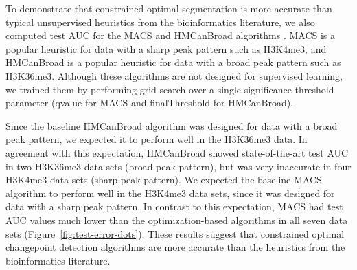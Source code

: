 \documentclass{article}
\begin{document}
To demonstrate that constrained optimal segmentation is more accurate
than typical unsupervised heuristics from the bioinformatics
literature, we also computed test AUC for the MACS and HMCanBroad
algorithms \citep{MACS, HMCan}. MACS is a popular heuristic for data
with a sharp peak pattern such as H3K4me3, and \mbox{HMCanBroad} is a
popular heuristic for data with a broad peak pattern such as
H3K36me3. Although these algorithms are not designed for supervised
learning, we trained them by performing grid search over a single
significance threshold parameter (qvalue for MACS and finalThreshold
for HMCanBroad).

Since the baseline HMCanBroad algorithm was designed for data with a
broad peak pattern, we expected it to perform well in the H3K36me3
data. In agreement with this expectation, HMCanBroad showed
state-of-the-art test AUC in two H3K36me3 data sets (broad peak
pattern), but was very inaccurate in four H3K4me3 data sets (sharp
peak pattern). We expected the baseline MACS algorithm to perform well
in the H3K4me3 data sets, since it was designed for data with a sharp
peak pattern. In contrast to this expectation, MACS had test AUC
values much lower than the optimization-based algorithms in all seven
data sets (Figure~\ref{fig:test-error-dots}). These results suggest
that constrained optimal changepoint detection algorithms are more
accurate than the heuristics from the bioinformatics literature.


%   
\end{document}
